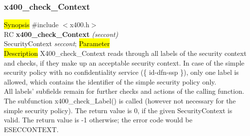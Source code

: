 \subsubsection{x400\_check\_Context}
\label{x4_ck_Scon}
\hl{Synopsis}
\#include $<$x400.h$>$ \\ [1ex]
RC {\bf x400\_check\_Context} {\em (seccont)} \\
SecurityContext {\em *seccont};
\hl{Parameter}
 \\[1ex]
\hl{Description}
X400\_check\_Context reads through all labels of the security context
and checks, if they make up an acceptable security context.
In case of the simple security policy with no confidentiality
service (\{ id-dfn-ssp \}),
only one label is allowed,
which contains the identifier of the simple security policy only.
\\
All labels' subfields
remain for further checks and actions of the calling function.
\\
The subfunction x400\_check\_Label() is called
(however not necessary for the simple security policy).
The return value is 0, if the given SecurityContext is valid.
The return value is -1 otherwise;
the error code would be ESECCONTEXT.

